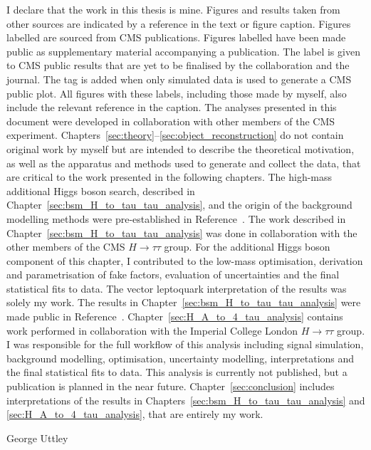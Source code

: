 \begin{titlepage}
\begin{adjustwidth}{1cm}{1cm}
I declare that the work in this thesis is mine. 
Figures and results taken from other sources are indicated by a reference in the text or figure caption. 
Figures labelled  are sourced from CMS publications. 
Figures labelled  have been made public as supplementary material accompanying a publication. 
The  label is given to CMS public results that are yet to be finalised by the collaboration and the journal.
The  tag is added when only simulated data is used to generate a CMS public plot.
All figures with these labels, including those made by myself, also include the relevant reference in the caption.
The analyses presented in this document were developed in collaboration with other members of the CMS experiment. 
Chapters~\ref{sec:theory}--\ref{sec:object_reconstruction} do not contain original work by myself but are intended to describe the theoretical motivation, as well as the apparatus and methods used to generate and collect the data, that are critical to the work presented in the following chapters. 
The high-mass additional Higgs boson search, described in Chapter~\ref{sec:bsm_H_to_tau_tau_analysis}, and the origin of the background modelling methods were pre-established in Reference~\cite{CMS_MSSM_Tau_2018}.
The work described in Chapter~\ref{sec:bsm_H_to_tau_tau_analysis} was done in collaboration with the other members of the CMS $H\rightarrow\tau\tau$ group.
For the additional Higgs boson component of this chapter, I contributed to the low-mass optimisation, derivation and parametrisation of fake factors, evaluation of uncertainties and the final statistical fits to data.
The vector leptoquark interpretation of the results was solely my work.
The results in Chapter~\ref{sec:bsm_H_to_tau_tau_analysis} were made public in Reference~\cite{CMS:2022rbd}.
Chapter~\ref{sec:H_A_to_4_tau_analysis} contains work performed in collaboration with the Imperial College London $H\rightarrow\tau\tau$ group.
I was responsible for the full workflow of this analysis including signal simulation, background modelling, optimisation, uncertainty modelling, interpretations and the final statistical fits to data.
This analysis is currently not published, but a publication is planned in the near future.
Chapter~\ref{sec:conclusion} includes interpretations of the results in Chapters~\ref{sec:bsm_H_to_tau_tau_analysis} and \ref{sec:H_A_to_4_tau_analysis}, that are entirely my work.

\begin{FlushRight}
George Uttley
\end{FlushRight}
\end{adjustwidth}
\vspace*{\fill}


\end{titlepage}
